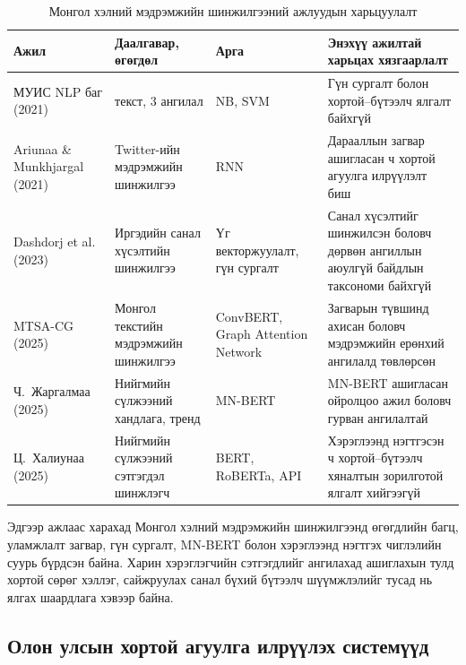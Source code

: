 \begin{table}[H]
  \centering
  \caption{Монгол хэлний мэдрэмжийн шинжилгээний ажлуудын харьцуулалт}
  \label{tab:mongolian-sentiment-comparison}
  \begingroup
  \footnotesize
  \setlength{\tabcolsep}{4.5pt}
  \renewcommand{\arraystretch}{1.22}
  \begin{tabular}{@{}>{\raggedright\arraybackslash}p{2.55cm}
                     >{\raggedright\arraybackslash}p{3.0cm}
                     >{\raggedright\arraybackslash}p{2.65cm}
                     >{\raggedright\arraybackslash}p{4.65cm}@{}}
    \toprule
    \textbf{Ажил} & \textbf{Даалгавар, өгөгдөл} & \textbf{Арга} &
    \textbf{Энэхүү ажилтай харьцах хязгаарлалт} \\
    \midrule
    МУИС NLP баг (2021) & 5000 текст, 3 ангилал &
    NB, SVM & Гүн сургалт болон хортой--бүтээлч ялгалт байхгүй \\[2pt]
    Ariunaa \& Munkhjargal (2021) & Twitter-ийн мэдрэмжийн шинжилгээ &
    RNN & Дарааллын загвар ашигласан ч хортой агуулга илрүүлэлт биш \\[2pt]
    Dashdorj et al. (2023) & Иргэдийн санал хүсэлтийн шинжилгээ &
    Үг векторжуулалт, гүн сургалт & Санал хүсэлтийг шинжилсэн боловч
    дөрвөн ангиллын аюулгүй байдлын таксономи байхгүй \\[2pt]
    MTSA-CG (2025) & Монгол текстийн мэдрэмжийн шинжилгээ &
    ConvBERT, Graph Attention Network & Загварын түвшинд ахисан боловч
    мэдрэмжийн ерөнхий ангилалд төвлөрсөн \\[2pt]
    Ч.~Жаргалмаа (2025) & Нийгмийн сүлжээний хандлага, тренд &
    MN-BERT & MN-BERT ашигласан ойролцоо ажил боловч гурван ангилалтай \\[2pt]
    Ц.~Халиунаа (2025) & Нийгмийн сүлжээний сэтгэгдэл шинжлэгч &
    BERT, RoBERTa, API & Хэрэглээнд нэгтгэсэн ч хортой--бүтээлч
    хяналтын зорилготой ялгалт хийгээгүй \\
    \bottomrule
  \end{tabular}
  \endgroup
\end{table}

Эдгээр ажлаас харахад Монгол хэлний мэдрэмжийн шинжилгээнд өгөгдлийн багц,
уламжлалт загвар, гүн сургалт, MN-BERT болон хэрэглээнд нэгтгэх чиглэлийн суурь
бүрдсэн байна. Харин хэрэглэгчийн сэтгэгдлийг ангилахад ашиглахын
тулд хортой сөрөг хэллэг, сайжруулах санал бүхий бүтээлч шүүмжлэлийг тусад нь
ялгах шаардлага хэвээр байна.


\subsection{Олон улсын хортой агуулга илрүүлэх системүүд}

